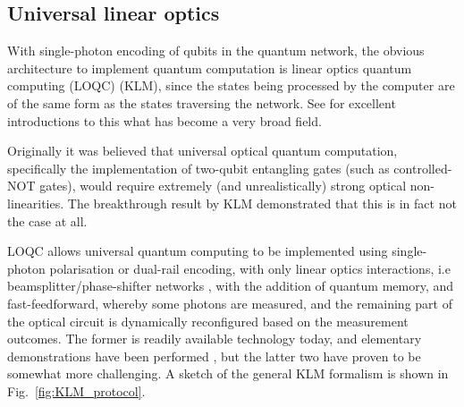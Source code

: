 \documentclass[aps,rmp,twocolumn,amsmath,amssymb,nofootinbib,superscriptaddress,longbibliography,floatfix]{revtex4-1}
\begin{document}
%
%

\subsection{Universal linear optics} \label{sec:KLM_univ}

With single-photon encoding of qubits in the quantum network, the obvious architecture to implement quantum computation is linear optics quantum computing (LOQC) \cite{bib:KLM01} (KLM), since the states being processed by the computer are of the same form as the states traversing the network. See \cite{bib:Kok05, bib:KokLovettBook} for excellent introductions to this what has become a very broad field.

Originally it was believed that universal optical quantum computation, specifically the implementation of two-qubit entangling gates (such as controlled-NOT gates), would require extremely (and unrealistically) strong optical non-linearities. The breakthrough result by KLM demonstrated that this is in fact not the case at all.

LOQC allows universal quantum computing to be implemented using single-photon polarisation or dual-rail encoding, with only linear optics interactions, i.e beamsplitter/phase-shifter networks \cite{bib:Reck94}, with the addition of quantum memory, and fast-feedforward, whereby some photons are measured, and the remaining part of the optical circuit is dynamically reconfigured based on the measurement outcomes. The former is readily available technology today, and elementary demonstrations have been performed \cite{bib:OBrien03, bib:UniversalLOOBrien}, but the latter two have proven to be somewhat more challenging. A sketch of the general KLM formalism is shown in Fig.~\ref{fig:KLM_protocol}.
\end{document}

